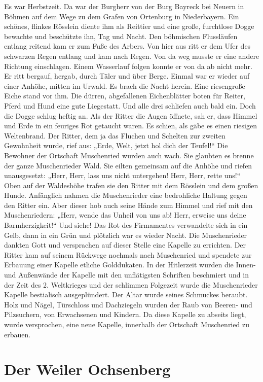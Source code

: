 \documentclass[12pt,a4pager]{book}
\begin{document}
Es war Herbstzeit. Da war der Burgherr von der Burg Bayreck bei Neuern in Böhmen
auf dem Wege zu dem Grafen von Ortenburg in Niederbayern. Ein schönes, flinkes
Rösslein diente ihm als Reittier und eine große, furchtlose Dogge bewachte und
beschützte ihn, Tag und Nacht. Den böhmischen Flussläufen entlang reitend kam er
zum Fuße des Arbers. Von hier aus ritt er dem Ufer des schwarzen Regen entlang
und kam nach Regen. Von da weg musste er eine andere Richtung einschlagen. Einem
Wasserlauf folgen konnte er von da ab nicht mehr. Er ritt bergauf, hergab, durch
Täler und über Berge. Einmal war er wieder auf einer Anhöhe, mitten im Urwald.
Es brach die Nacht herein. Eine riesengroße Eiche stand vor ihm. Die dürren,
abgefallenen Eichenblätter boten für Reiter, Pferd und Hund eine gute
Liegestatt. Und alle drei schliefen auch bald ein. Doch die Dogge schlug heftig
an. Als der Ritter die Augen öffnete, sah er, dass Himmel und Erde in ein
feuriges Rot getaucht waren. Es schien, als gäbe es einen riesigen Weltenbrand.
Der Ritter, dem ja das Fluchen und Schelten zur zweiten Gewohnheit wurde, rief
aus: „Erde, Welt, jetzt hol dich der Teufel!“ Die Bewohner der Ortschaft
Muschenried wurden auch wach. Sie glaubten es brenne der ganze Muschenrieder
Wald. Sie eilten gemeinsam auf die Anhöhe und riefen unausgesetzt: „Herr, Herr,
lass uns nicht untergehen! Herr, Herr, rette uns!“ Oben auf der Waldeshöhe
trafen sie den Ritter mit dem Rösslein und dem großen Hunde. Anfänglich nahmen
die Muschenrieder eine bedrohliche Haltung gegen den Ritter ein. Aber dieser hob
auch seine Hände zum Himmel und rief mit den Muschenriedern: „Herr, wende das
Unheil von uns ab! Herr, erweise uns deine Barmherzigkeit!“ Und siehe! Das Rot
des Firmamentes verwandelte sich in ein Gelb, dann in ein Grün und plötzlich war
es wieder Nacht. Die Muschenrieder dankten Gott und versprachen auf dieser
Stelle eine Kapelle zu errichten. Der Ritter kam auf seinem Rückwege nochmals
nach Muschenried und spendete zur Erbauung einer Kapelle etliche Golddukaten. In
der Hitlerzeit wurden die Innen- und Außenwände der Kapelle mit den unflätigsten
Schriften beschmiert und in der Zeit des 2. Weltkrieges und der schlimmen
Folgezeit wurde die Muschenrieder Kapelle bestialisch ausgeplündert. Der Altar
wurde seines Schmuckes beraubt. Holz und Nägel, Türschloss und Dachziegeln
wurden der Raub von Beeren- und Pilzsuchern, von Erwachsenen und Kindern. Da
diese Kapelle zu abseits liegt, wurde versprochen, eine neue Kapelle, innerhalb
der Ortschaft Muschenried zu erbauen.

\section{Der Weiler Ochsenberg}
\end{document}
